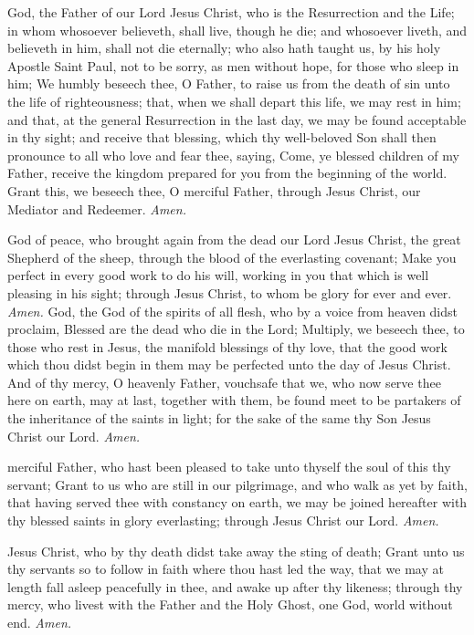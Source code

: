  God, the Father of our Lord Jesus Christ, who is the Resurrection and the Life; in whom whosoever believeth, shall live, though he die; and whosoever liveth, and believeth in him, shall not die eternally; who also hath taught us, by his holy Apostle Saint Paul, not to be sorry, as men without hope, for those who sleep in him; We humbly beseech thee, O Father, to raise us from the death of sin unto the life of righteousness; that, when we shall depart this life, we may rest in him; and that, at the general Resurrection in the last day, we may be found acceptable in thy sight; and receive that blessing, which thy well-beloved Son shall then pronounce to all who love and fear thee, saying, Come, ye blessed children of my Father, receive the kingdom prepared for you from the beginning of the world. Grant this, we beseech thee, O merciful Father, through Jesus Christ, our Mediator and Redeemer. \textit{Amen.}\par
{}
 God of peace, who brought again from the dead our Lord Jesus Christ, the great Shepherd of the sheep, through the blood of the everlasting covenant; Make you perfect in every good work to do his will, working in you that which is well pleasing in his sight; through Jesus Christ, to whom be glory for ever and ever. \textit{Amen.}
 God, the God of the spirits of all flesh, who by a voice from heaven didst proclaim, Blessed are the dead who die in the Lord; Multiply, we beseech thee, to those who rest in Jesus, the manifold blessings of thy love, that the good work which thou didst begin in them may be perfected unto the day of Jesus Christ. And of thy mercy, O heavenly Father, vouchsafe that we, who now serve thee here on earth, may at last, together with them, be found meet to be partakers of the inheritance of the saints in light; for the sake of the same thy Son Jesus Christ our Lord. \textit{Amen.}\par
{}
 merciful Father, who hast been pleased to take unto thyself the soul of this thy servant; Grant to us who are still in our pilgrimage, and who walk as yet by faith, that having served thee with constancy on earth, we may be joined hereafter with thy blessed saints in glory everlasting; through Jesus Christ our Lord. \textit{Amen.}\par
{}
 Jesus Christ, who by thy death didst take away the sting of death; Grant unto us thy servants so to follow in faith where thou hast led the way, that we may at length fall asleep peacefully in thee, and awake up after thy likeness; through thy mercy, who livest with the Father and the Holy Ghost, one God, world without end. \textit{Amen.}\par
